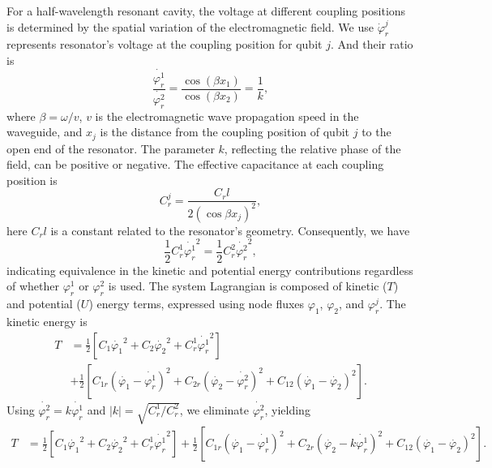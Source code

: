 \documentclass[reprint,superscriptaddress,preprintnumbers,longbibliography,
amsmath,amssymb,aps,floatfix,pra,twocolumn, tightenlines %
]{revtex4-2}
\begin{document}
For a half-wavelength resonant cavity, the voltage at different coupling positions is determined by the spatial variation of the electromagnetic field. We use \( \dot{\varphi}_r^j \) represents resonator’s voltage at the coupling position for qubit \( j \). And their ratio is
\begin{equation}
    \frac{\dot{\varphi _r^1}}{\dot{\varphi _r^2}} = \frac{\cos (\beta x_1)}{\cos (\beta x_2)} = \frac{1}{k},
\end{equation}
where \( \beta = \omega / v \), \( v \) is the electromagnetic wave propagation speed in the waveguide, and \( x_j \) is the distance from the coupling position of qubit \( j \) to the open end of the resonator. The parameter \( k \), reflecting the relative phase of the field, can be positive or negative. The effective capacitance at each coupling position is
\begin{equation}
    C_r^j=\frac{C_rl}{2\left(\cos \beta x_j\right)^2 },
\end{equation}
here \( C_rl \) is a constant related to the resonator’s geometry. Consequently, we have 
\begin{equation}
\frac{1}{2} C_r^1 \dot{\varphi_r^1}^2 = \frac{1}{2} C_r^2 \dot{\varphi_r^2}^2,
\end{equation}
indicating equivalence in the kinetic and potential energy contributions regardless of whether \( \varphi_r^1 \) or \( \varphi_r^2 \) is used.
The system Lagrangian is composed of kinetic (\( T \)) and potential (\( U \)) energy terms, expressed using node fluxes \( \varphi_1 \), \( \varphi_2 \), and \( \varphi_r^j \). The kinetic energy is
\begin{equation}
\begin{aligned}
    T &=\frac{1}{2}\left[C_1 \dot{\varphi_1}^2 + C_2 \dot{\varphi_2}^2 + C_r^1 \dot{\varphi_r^1}^2 \right] \\
    &+ \frac{1}{2} \left[C_{1r}\left(\dot{\varphi_1}- \dot{\varphi_r^1}\right)^2 +C_{2r}\left(\dot{\varphi_2}- \dot{\varphi_r^2}\right)^2 +C_{12}\left(\dot{\varphi_1}- \dot{\varphi_2}\right)^2 \right].
\end{aligned}
\end{equation}
Using \( \dot{\varphi_r^2} = k \dot{\varphi_r^1} \) and \( |k| = \sqrt{C_r^1 / C_r^2} \), we eliminate \( \dot{\varphi_r^2} \), yielding
\begin{equation}
\begin{aligned}
T &= \frac{1}{2} \left[ C_1 \dot{\varphi_1}^2 + C_2 \dot{\varphi_2}^2 + C_r^1 \dot{\varphi_r^1}^2 \right] + \frac{1}{2} \left[ C_{1r} \left( \dot{\varphi_1} - \dot{\varphi_r^1} \right)^2 + C_{2r} \left( \dot{\varphi_2} - k \dot{\varphi_r^1} \right)^2 + C_{12} \left( \dot{\varphi_1} - \dot{\varphi_2} \right)^2 \right].
\end{aligned}
\end{equation}
\end{document}
